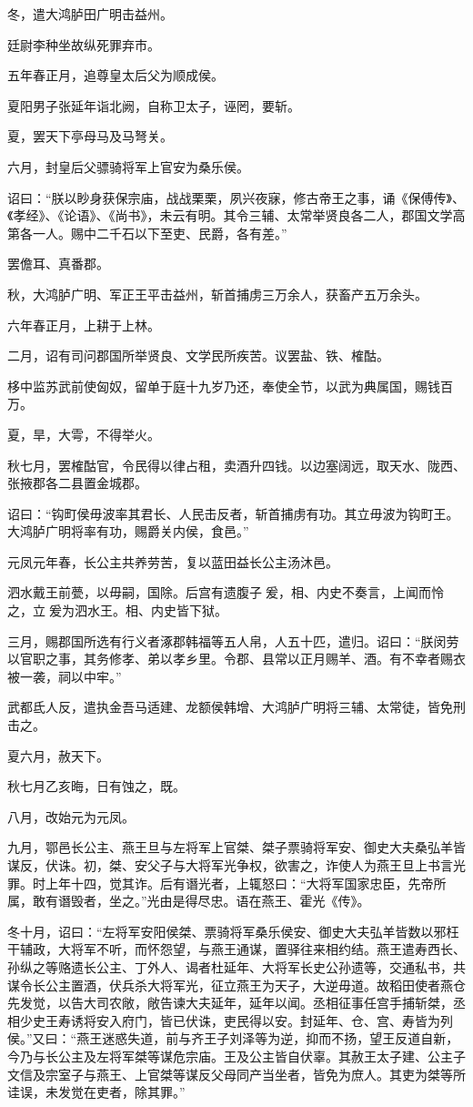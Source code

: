 \documentclass[]{article}
\begin{document}
冬，遣大鸿胪田广明击益州。

廷尉李种坐故纵死罪弃市。

五年春正月，追尊皇太后父为顺成侯。

夏阳男子张延年诣北阙，自称卫太子，诬罔，要斩。

夏，罢天下亭母马及马弩关。

六月，封皇后父骠骑将军上官安为桑乐侯。

诏曰：``朕以眇身获保宗庙，战战栗栗，夙兴夜寐，修古帝王之事，诵《保傅传》、《孝经》、《论语》、《尚书》，未云有明。其令三辅、太常举贤良各二人，郡国文学高第各一人。赐中二千石以下至吏、民爵，各有差。''

罢儋耳、真番郡。

秋，大鸿胪广明、军正王平击益州，斩首捕虏三万余人，获畜产五万余头。

六年春正月，上耕于上林。

二月，诏有司问郡国所举贤良、文学民所疾苦。议罢盐、铁、榷酤。

栘中监苏武前使匈奴，留单于庭十九岁乃还，奉使全节，以武为典属国，赐钱百万。

夏，旱，大雩，不得举火。

秋七月，罢榷酤官，令民得以律占租，卖酒升四钱。以边塞阔远，取天水、陇西、张掖郡各二县置金城郡。

诏曰：``钩町侯毋波率其君长、人民击反者，斩首捕虏有功。其立毋波为钩町王。大鸿胪广明将率有功，赐爵关内侯，食邑。''

元凤元年春，长公主共养劳苦，复以蓝田益长公主汤沐邑。

泗水戴王前甍，以毋嗣，国除。后宫有遗腹子爰，相、内史不奏言，上闻而怜之，立爰为泗水王。相、内史皆下狱。

三月，赐郡国所选有行义者涿郡韩福等五人帛，人五十匹，遣归。诏曰：``朕闵劳以官职之事，其务修孝、弟以孝乡里。令郡、县常以正月赐羊、酒。有不幸者赐衣被一袭，祠以中牢。''

武都氐人反，遣执金吾马适建、龙额侯韩增、大鸿胪广明将三辅、太常徒，皆免刑击之。

夏六月，赦天下。

秋七月乙亥晦，日有蚀之，既。

八月，改始元为元凤。

九月，鄂邑长公主、燕王旦与左将军上官桀、桀子票骑将军安、御史大夫桑弘羊皆谋反，伏诛。初，桀、安父子与大将军光争权，欲害之，诈使人为燕王旦上书言光罪。时上年十四，觉其诈。后有谮光者，上辄怒曰：``大将军国家忠臣，先帝所属，敢有谮毁者，坐之。''光由是得尽忠。语在燕王、霍光《传》。

冬十月，诏曰：``左将军安阳侯桀、票骑将军桑乐侯安、御史大夫弘羊皆数以邪枉干辅政，大将军不听，而怀怨望，与燕王通谋，置驿往来相约结。燕王遣寿西长、孙纵之等赂遗长公主、丁外人、谒者杜延年、大将军长史公孙遗等，交通私书，共谋令长公主置酒，伏兵杀大将军光，征立燕王为天子，大逆毋道。故稻田使者燕仓先发觉，以告大司农敞，敞告谏大夫延年，延年以闻。丞相征事任宫手捕斩桀，丞相少史王寿诱将安入府门，皆已伏诛，吏民得以安。封延年、仓、宫、寿皆为列侯。''又曰：``燕王迷惑失道，前与齐王子刘泽等为逆，抑而不扬，望王反道自新，今乃与长公主及左将军桀等谋危宗庙。王及公主皆自伏辜。其赦王太子建、公主子文信及宗室子与燕王、上官桀等谋反父母同产当坐者，皆免为庶人。其吏为桀等所诖误，未发觉在吏者，除其罪。''
\end{document}
